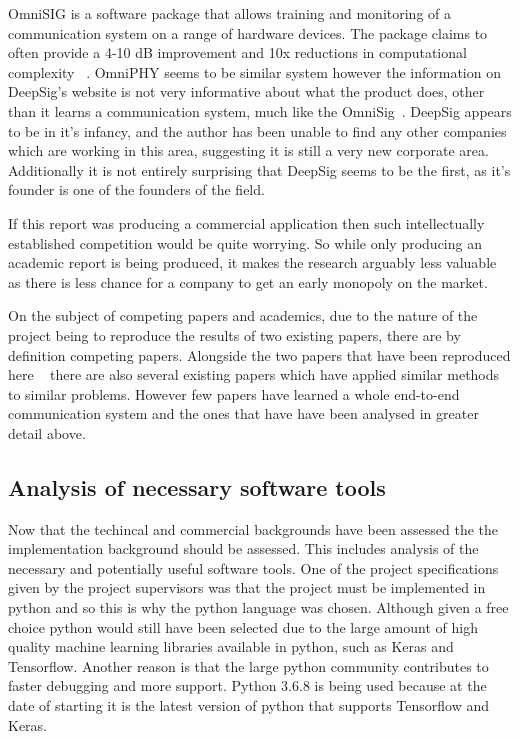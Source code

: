 \documentclass[12pt,onecolumn,letterpaper]{article}
\begin{document}
OmniSIG is a software package that allows training and monitoring of a communication system on a range of hardware devices. The package claims to often provide a 4-10 dB improvement and 10x reductions in computational complexity ~\cite{DeepsigOmnisig}. OmniPHY seems to be similar system however the information on DeepSig's website is not very informative about what the product does, other than it learns a communication system, much like the OmniSig~\cite{DeepsigOmniphy}. DeepSig appears to be in it's infancy, and the author has been unable to find any other companies which are working in this area, suggesting it is still a very new corporate area. Additionally it is not entirely surprising that DeepSig seems to be the first, as it's founder is one of the founders of the field. 

If this report was producing a commercial application then such intellectually established competition would be quite worrying. So while only producing an academic report is being produced, it makes the research arguably less valuable as there is less chance for a company to get an early monopoly on the market. 

On the subject of competing papers and academics, due to the nature of the project being to reproduce the results of two existing papers, there are by definition competing papers. Alongside the two papers that have been reproduced here ~\cite{oShea,Aoudia} there are also several existing papers which have applied similar methods to similar problems. However few papers have learned a whole end-to-end communication system and the ones that have have been analysed in greater detail above.

\subsection{Analysis of necessary software tools}

Now that the techincal and commercial backgrounds have been assessed the the implementation background should be assessed. This includes analysis of the necessary and potentially useful software tools. One of the project specifications given by the project supervisors was that the project must be implemented in python and so this is why the python language was chosen. Although given a free choice python would still have been selected due to the large amount of high quality machine learning libraries available in python, such as Keras and Tensorflow. Another reason is that the large python community contributes to faster debugging and more support. Python 3.6.8 is being used because at the date of starting it is the latest version of python that supports Tensorflow and Keras. 
\end{document}

